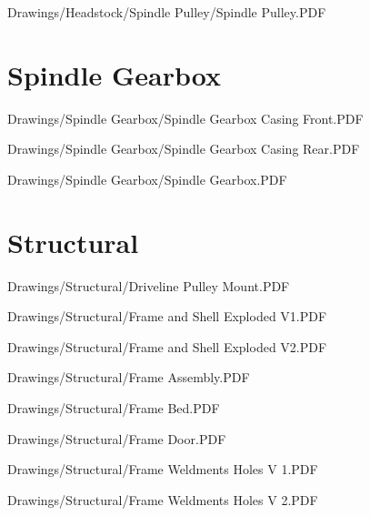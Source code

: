 
{Drawings/Headstock/Spindle Pulley/Spindle Pulley.PDF}

\section{Spindle Gearbox}


{Drawings/Spindle Gearbox/Spindle Gearbox Casing Front.PDF}


{Drawings/Spindle Gearbox/Spindle Gearbox Casing Rear.PDF}


{Drawings/Spindle Gearbox/Spindle Gearbox.PDF}

\section{Structural}


{Drawings/Structural/Driveline Pulley Mount.PDF}


{Drawings/Structural/Frame and Shell Exploded V1.PDF}


{Drawings/Structural/Frame and Shell Exploded V2.PDF}


{Drawings/Structural/Frame Assembly.PDF}


{Drawings/Structural/Frame Bed.PDF}


{Drawings/Structural/Frame Door.PDF}


{Drawings/Structural/Frame Weldments Holes V 1.PDF}


{Drawings/Structural/Frame Weldments Holes V 2.PDF}

